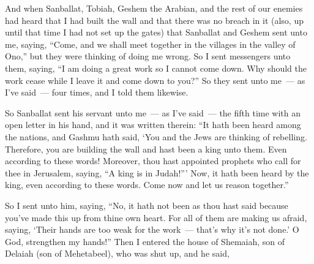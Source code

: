 
\begin{inparaenum}
   And when Sanballat, Tobiah, Geshem the Arabian, and the rest of our enemies had heard that I had built the wall and that there was no breach in it (also, up until that time I had not set up the gates)%
   that Sanballat and Geshem sent unto me, saying, ``Come, and we shall meet together in the villages in the valley of Ono,'' but they were thinking of doing me wrong.%
   So I sent messengers unto them, saying, ``I am doing a great work so I cannot come down. Why should the work cease while I leave it and come down to you?''%
   So they sent unto me~--- as I've said~--- four times, and I told them likewise.%
  
   So Sanballat sent his servant unto me~--- as I've said~--- the fifth time with an open letter in his hand,%
   and it was written therein: ``It hath been heard among the nations, and Gashmu hath said, `You and the Jews are thinking of rebelling. Therefore, you are building the wall and hast been a king unto them. Even according to these words!%
   Moreover, thou hast appointed prophets who call for thee in Jerusalem, saying, ``A king is in Judah!''' Now, it hath been heard by the king, even according to these words. Come now and let us reason together.''%
  
   So I sent unto him, saying, ``No, it hath not been as thou hast said because you've made this up from thine own heart.%
   For all of them are making us afraid, saying, `Their hands are too weak for the work~--- that's why it's not done.' O God, strengthen my hands!''%
   Then I entered the house of Shemaiah, son of Delaiah (son of Mehetabeel), who was shut up, and he said,%



  

\end{inparaenum}
